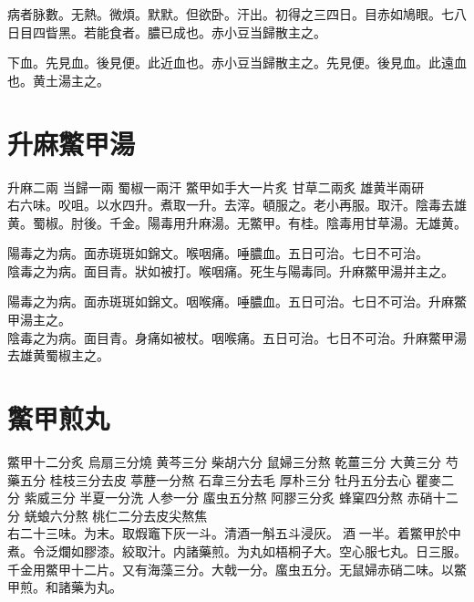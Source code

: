 病者脉數。无熱。微煩。默默。但欲卧。汗出。初得之三四日。目赤如鳩眼。七八日目四眥黑。若能食者。膿已成也。赤{\khaaitp 小}豆当歸散主之。

下血。先見血。後見便。此近血也。赤小豆当歸散主之。先見便。後見血。此遠血也。黄土湯主之。

\section{升麻鱉甲湯}

升麻{\scriptsize 二兩} 当歸{\scriptsize 一兩} 蜀椒{\scriptsize 一兩汗} 鱉甲{\scriptsize 如手大一片炙} 甘草{\scriptsize 二兩炙} 雄黄{\scriptsize 半兩研}\\
右六味。㕮咀。以水四升。煮取一升。去滓。頓服之。老小再服。取汗。陰毒去雄黄。蜀椒。{\scriptsize 肘後。千金。陽毒用升麻湯。无鱉甲。有桂。陰毒用甘草湯。无雄黄。}

陽毒之为病。面赤斑斑如錦文。喉咽痛。唾膿血。五日可治。七日不可治。\\
陰毒之为病。面目青。狀如被打。喉咽痛。死生与陽毒同。升麻鱉甲湯并主之。{\wuben}

陽毒之为病。面赤斑斑如錦文。咽喉痛。唾膿血。五日可治。七日不可治。升麻鱉甲湯主之。\\
陰毒之为病。面目青。身痛如被杖。咽喉痛。五日可治。七日不可治。升麻鱉甲湯去雄黄蜀椒主之。{\dengben}


\section{鱉甲煎丸}

鱉甲{\scriptsize 十二分炙} 烏扇{\scriptsize 三分燒} 黄芩{\scriptsize 三分} 柴胡{\scriptsize 六分} 鼠婦{\scriptsize 三分熬} 乾薑{\scriptsize 三分} 大黄{\scriptsize 三分} 芍藥{\scriptsize 五分} 桂枝{\scriptsize 三分去皮} 葶藶{\scriptsize 一分熬} 石韋{\scriptsize 三分去毛} 厚朴{\scriptsize 三分} 牡丹{\scriptsize 五分去心} 瞿麥{\scriptsize 二分} 紫威{\scriptsize 三分} 半夏{\scriptsize 一分洗} 人参{\scriptsize 一分} 䗪虫{\scriptsize 五分熬} 阿膠{\scriptsize 三分炙} 蜂窠{\scriptsize 四分熬} 赤硝{\scriptsize 十二分} 蜣蜋{\scriptsize 六分熬} 桃仁{\scriptsize 二分去皮尖熬焦}\\
右二十三味。为末。取煆竈下灰一斗。清酒一斛五斗浸灰。{\sungtpii 𠊱}酒{\sungtpii 𥁞}一半。着鱉甲於中煮。令泛爛如膠漆。絞取汁。内諸藥煎。为丸如梧桐子大。空心服七丸。日三服。{\scriptsize 千金用鱉甲十二片。又有海藻三分。大戟一分。䗪虫五分。无鼠婦赤硝二味。以鱉甲煎。和諸藥为丸。}

